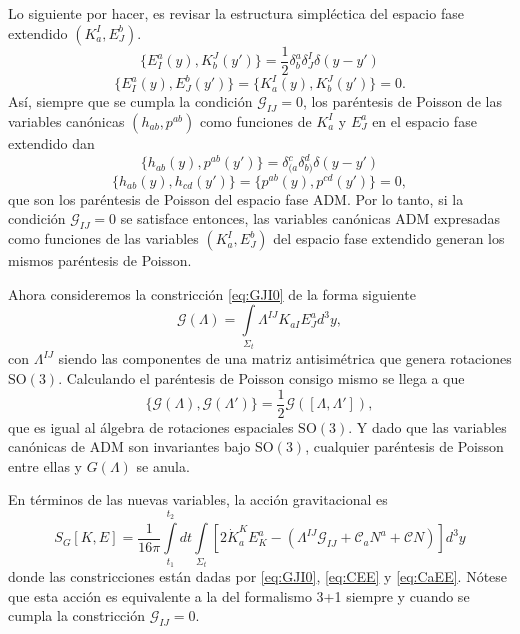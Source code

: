 Lo siguiente por hacer, es revisar la estructura simpl\'{e}ctica del espacio fase extendido $(K^{I}_{a}, E^{b}_{J})$.
%
\begin{equation}
\{E^{a}_{I}(y), K^{J}_{b}(y')\} = \frac{1}{2} \delta^{a}_{b} \delta^{I}_{J} \delta(y-y')
\end{equation}
%
\begin{equation}
\{E^{a}_{I}(y), E^{b}_{J}(y')\} = \{K^{I}_{a}(y), K^{J}_{b}(y')\} = 0.
\end{equation}
%
As\'{i}, siempre que se cumpla la condici\'{o}n $\mathcal{G}_{IJ} = 0$, los par\'{e}ntesis de Poisson de las variables can\'{o}nicas $(h_{ab}, p^{ab})$ como funciones de $K^{I}_{a}$ y $E^{a}_{J}$ en el espacio fase extendido dan
%
\begin{equation}
\{h_{ab}(y), p^{ab}(y')\} = \delta^{c}_{(a} \delta^{d}_{b)} \delta(y-y')
\end{equation}
%
\begin{equation}
\{h_{ab}(y), h_{cd}(y')\} = \{p^{ab}(y), p^{cd}(y')\} = 0,
\end{equation}
%
que son los par\'{e}ntesis de Poisson del espacio fase ADM. Por lo tanto, si la condici\'{o}n $\mathcal{G}_{IJ} = 0$ se satisface entonces, las variables can\'{o}nicas ADM expresadas como funciones de las variables $(K^{I}_{a}, E^{b}_{J})$ del espacio fase extendido generan los mismos par\'{e}ntesis de Poisson.

Ahora consideremos la constricci\'{o}n \eqref{eq:GJI0} de la forma siguiente
%
\begin{equation}
\mathcal{G}(\Lambda) = \int\limits_{\Sigma_{t}} \Lambda^{IJ} K_{aI} E^{a}_{J} d^{3}y,
\end{equation}
%
con $\Lambda^{IJ}$ siendo las componentes de una matriz antisim\'{e}trica que genera rotaciones $\mathrm{SO}(3)$. Calculando el par\'{e}ntesis de Poisson consigo mismo se llega a que
%
\begin{equation}
\{\mathcal{G}(\Lambda), \mathcal{G}(\Lambda')\} = \frac{1}{2} \mathcal{G}([\Lambda, \Lambda']),
\end{equation}
%
que es igual al \'{a}lgebra de rotaciones espaciales $\mathrm{SO}(3)$. Y dado que las variables can\'{o}nicas de ADM son invariantes bajo $\mathrm{SO}(3)$, cualquier par\'{e}ntesis de Poisson entre ellas y $G(\Lambda)$ se anula.

En t\'{e}rminos de las nuevas variables, la acci\'{o}n gravitacional es
%
\begin{equation}
S_{G}[K,E] = \frac{1}{16 \pi} \int\limits^{t_{2}}_{t_{1}} dt \int\limits_{\Sigma_{t}} \left[2 \dot{K}^{K}_{a} E^{a}_{K} - (\Lambda^{IJ} \mathcal{G}_{IJ} + \mathcal{C}_{a} N^{a} + \mathcal{C} N) \right] d^{3}y
\end{equation}
%
donde las constricciones est\'{a}n dadas por \eqref{eq:GJI0}, \eqref{eq:CEE} y \eqref{eq:CaEE}. N\'{o}tese que esta acci\'{o}n es equivalente a la del formalismo 3+1 siempre y cuando se cumpla la constricci\'{o}n $\mathcal{G}_{IJ} = 0$.
